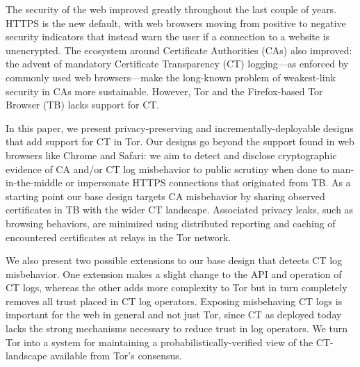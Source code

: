 The security of the web improved greatly throughout the last couple of years.
HTTPS is the new default, with web browsers moving from positive to
negative security indicators that instead warn the user if a connection to a
website is unencrypted.  The ecosystem around Certificate Authorities (CAs) also
improved:
	the advent of mandatory Certificate Transparency (CT) logging---as
	enforced by commonly used web browsers---make the long-known problem of
	weakest-link security in CAs more sustainable.
However, Tor and the Firefox-based Tor Browser (TB) lacks support for CT.

\hspace{12pt}
In this paper, we present privacy-preserving and incrementally-deployable
designs that add support for CT in Tor. Our designs go beyond the
support found in web browsers like Chrome and Safari:
	we aim to detect and disclose cryptographic evidence of CA and/or
	CT log misbehavior to public scrutiny when done to man-in-the-middle or
	impersonate HTTPS connections that originated from TB.
As a starting point our base design targets CA misbehavior by sharing observed
certificates in TB with the wider CT landscape.  Associated privacy
leaks, such as browsing behaviors, are minimized using distributed reporting and
caching of encountered certificates at relays in the Tor network.


\hspace{12pt}
We also present two possible extensions to our base design that detects CT log
misbehavior. One extension makes a slight change to the API and operation
of CT logs, whereas the other adds more complexity to Tor but in turn completely
removes all trust placed in CT log operators.  Exposing misbehaving CT logs
is important for the web in general and not just Tor, since CT as deployed today
lacks the strong mechanisms necessary to reduce trust in log operators.  We turn
Tor into a system for maintaining a probabilistically-verified view of the 
CT-landscape available from Tor’s consensus.
